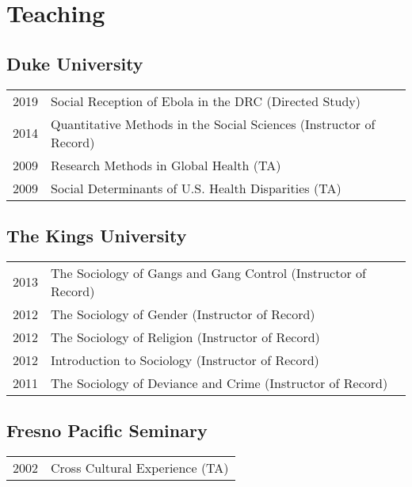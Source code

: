 \section*{Teaching}
\subsection*{Duke University}

\begin{tabular}{p{} p{}}
2019 & Social Reception of Ebola in the DRC (Directed Study) \\
2014 & Quantitative Methods in the Social Sciences (Instructor of Record)\\
2009 & Research Methods in Global Health (TA) \\
2009 & Social Determinants of U.S. Health Disparities (TA)\\
\end{tabular}

\subsection*{The Kings University}

\begin{tabular}{p{} p{}}
2013 & The Sociology of Gangs and Gang Control (Instructor of Record)\\
2012 & The Sociology of Gender (Instructor of Record)\\
2012 & The Sociology of Religion (Instructor of Record)\\
2012 & Introduction to Sociology (Instructor of Record)\\
2011 & The Sociology of Deviance and Crime (Instructor of Record)\\
\end{tabular}

\subsection*{Fresno Pacific Seminary}

\begin{tabular}{p{} p{}}
2002 & Cross Cultural Experience (TA) \\
\end{tabular}
\vspace{-1em}